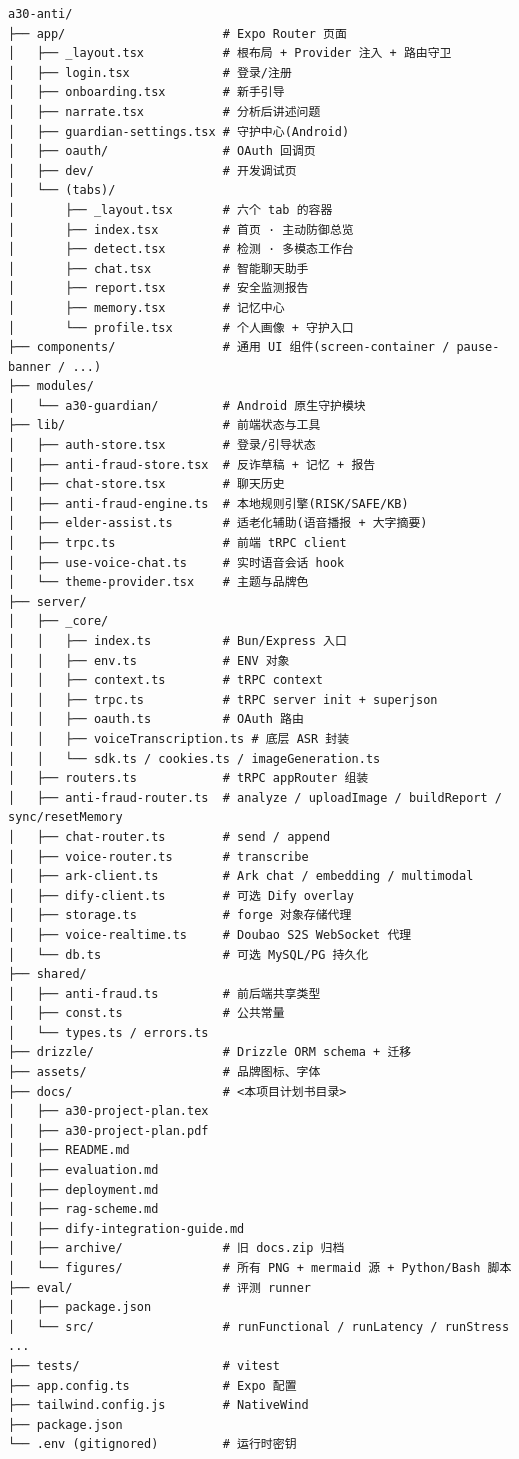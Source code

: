 \documentclass[UTF8,a4paper,12pt]{ctexart}
\begin{document}
\begin{lstlisting}[language={},basicstyle=\ttfamily\footnotesize]
a30-anti/
├── app/                      # Expo Router 页面
│   ├── _layout.tsx           # 根布局 + Provider 注入 + 路由守卫
│   ├── login.tsx             # 登录/注册
│   ├── onboarding.tsx        # 新手引导
│   ├── narrate.tsx           # 分析后讲述问题
│   ├── guardian-settings.tsx # 守护中心(Android)
│   ├── oauth/                # OAuth 回调页
│   ├── dev/                  # 开发调试页
│   └── (tabs)/
│       ├── _layout.tsx       # 六个 tab 的容器
│       ├── index.tsx         # 首页 · 主动防御总览
│       ├── detect.tsx        # 检测 · 多模态工作台
│       ├── chat.tsx          # 智能聊天助手
│       ├── report.tsx        # 安全监测报告
│       ├── memory.tsx        # 记忆中心
│       └── profile.tsx       # 个人画像 + 守护入口
├── components/               # 通用 UI 组件(screen-container / pause-banner / ...)
├── modules/
│   └── a30-guardian/         # Android 原生守护模块
├── lib/                      # 前端状态与工具
│   ├── auth-store.tsx        # 登录/引导状态
│   ├── anti-fraud-store.tsx  # 反诈草稿 + 记忆 + 报告
│   ├── chat-store.tsx        # 聊天历史
│   ├── anti-fraud-engine.ts  # 本地规则引擎(RISK/SAFE/KB)
│   ├── elder-assist.ts       # 适老化辅助(语音播报 + 大字摘要)
│   ├── trpc.ts               # 前端 tRPC client
│   ├── use-voice-chat.ts     # 实时语音会话 hook
│   └── theme-provider.tsx    # 主题与品牌色
├── server/
│   ├── _core/
│   │   ├── index.ts          # Bun/Express 入口
│   │   ├── env.ts            # ENV 对象
│   │   ├── context.ts        # tRPC context
│   │   ├── trpc.ts           # tRPC server init + superjson
│   │   ├── oauth.ts          # OAuth 路由
│   │   ├── voiceTranscription.ts # 底层 ASR 封装
│   │   └── sdk.ts / cookies.ts / imageGeneration.ts
│   ├── routers.ts            # tRPC appRouter 组装
│   ├── anti-fraud-router.ts  # analyze / uploadImage / buildReport / sync/resetMemory
│   ├── chat-router.ts        # send / append
│   ├── voice-router.ts       # transcribe
│   ├── ark-client.ts         # Ark chat / embedding / multimodal
│   ├── dify-client.ts        # 可选 Dify overlay
│   ├── storage.ts            # forge 对象存储代理
│   ├── voice-realtime.ts     # Doubao S2S WebSocket 代理
│   └── db.ts                 # 可选 MySQL/PG 持久化
├── shared/
│   ├── anti-fraud.ts         # 前后端共享类型
│   ├── const.ts              # 公共常量
│   └── types.ts / errors.ts
├── drizzle/                  # Drizzle ORM schema + 迁移
├── assets/                   # 品牌图标、字体
├── docs/                     # <本项目计划书目录>
│   ├── a30-project-plan.tex
│   ├── a30-project-plan.pdf
│   ├── README.md
│   ├── evaluation.md
│   ├── deployment.md
│   ├── rag-scheme.md
│   ├── dify-integration-guide.md
│   ├── archive/              # 旧 docs.zip 归档
│   └── figures/              # 所有 PNG + mermaid 源 + Python/Bash 脚本
├── eval/                     # 评测 runner
│   ├── package.json
│   └── src/                  # runFunctional / runLatency / runStress ...
├── tests/                    # vitest
├── app.config.ts             # Expo 配置
├── tailwind.config.js        # NativeWind
├── package.json
└── .env (gitignored)         # 运行时密钥
\end{lstlisting}
\end{document}
